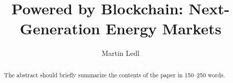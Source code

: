 \documentclass[runningheads]{llncs}
\begin{document}
%
\title{Powered by Blockchain: Next-Generation Energy Markets}
%
%
\author{Martin Ledl}
%
%
%
\maketitle              %
%
\begin{abstract}
The abstract should briefly summarize the contents of the paper in
150--250 words.

\end{abstract}
%
%
%
\end{document}
